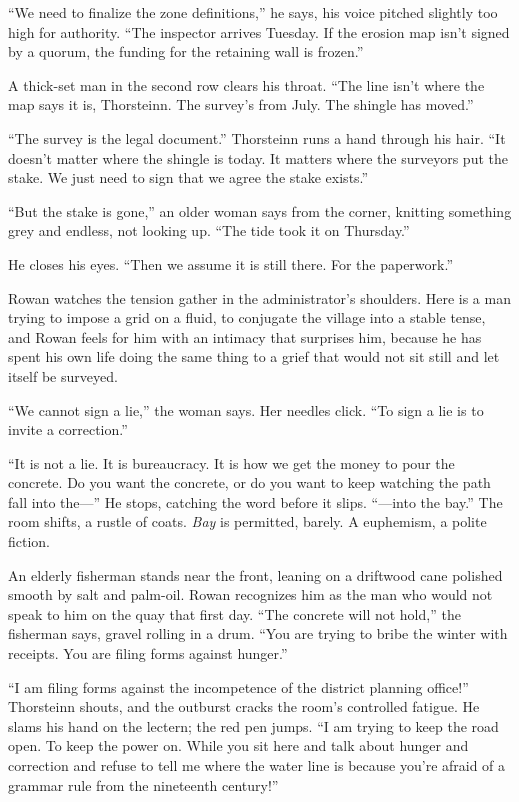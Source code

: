 \documentclass[11pt,oneside]{book}
\begin{document}
``We need to finalize the zone definitions,'' he says, his voice pitched
slightly too high for authority. ``The inspector arrives Tuesday. If the
erosion map isn't signed by a quorum, the funding for the retaining wall
is frozen.''

A thick-set man in the second row clears his throat. ``The line isn't
where the map says it is, Thorsteinn. The survey's from July. The
shingle has moved.''

``The survey is the legal document.'' Thorsteinn runs a hand through his
hair. ``It doesn't matter where the shingle is today. It matters where
the surveyors put the stake. We just need to sign that we agree the
stake exists.''

``But the stake is gone,'' an older woman says from the corner, knitting
something grey and endless, not looking up. ``The tide took it on
Thursday.''

He closes his eyes. ``Then we assume it is still there. For the
paperwork.''

Rowan watches the tension gather in the administrator's shoulders. Here
is a man trying to impose a grid on a fluid, to conjugate the village
into a stable tense, and Rowan feels for him with an intimacy that
surprises him, because he has spent his own life doing the same thing to
a grief that would not sit still and let itself be surveyed.

``We cannot sign a lie,'' the woman says. Her needles click. ``To sign a
lie is to invite a correction.''

``It is not a lie. It is bureaucracy. It is how we get the money to pour
the concrete. Do you want the concrete, or do you want to keep watching
the path fall into the---'' He stops, catching the word before it slips.
``---into the bay.'' The room shifts, a rustle of coats. \emph{Bay} is
permitted, barely. A euphemism, a polite fiction.

An elderly fisherman stands near the front, leaning on a driftwood cane
polished smooth by salt and palm-oil. Rowan recognizes him as the man
who would not speak to him on the quay that first day. ``The concrete
will not hold,'' the fisherman says, gravel rolling in a drum. ``You are
trying to bribe the winter with receipts. You are filing forms against
hunger.''

``I am filing forms against the incompetence of the district planning
office!'' Thorsteinn shouts, and the outburst cracks the room's
controlled fatigue. He slams his hand on the lectern; the red pen jumps.
``I am trying to keep the road open. To keep the power on. While you sit
here and talk about hunger and correction and refuse to tell me where
the water line is because you're afraid of a grammar rule from the
nineteenth century!''
\end{document}
